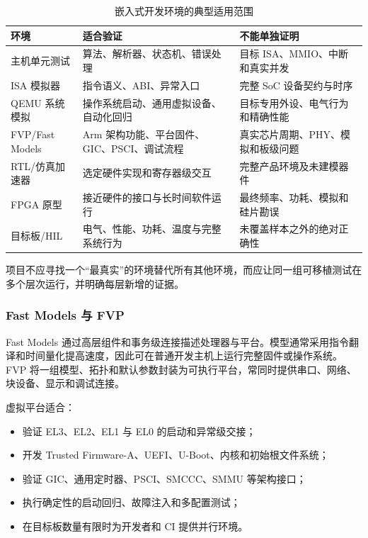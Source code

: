 \begin{table}[htbp]
  \centering
  \caption{嵌入式开发环境的典型适用范围}
  \begin{tabular}{p{}p{}p{}}
    \toprule
    环境 & 适合验证 & 不能单独证明 \\
    \midrule
    主机单元测试 & 算法、解析器、状态机、错误处理 & 目标 ISA、MMIO、中断和真实并发 \\
    ISA 模拟器 & 指令语义、ABI、异常入口 & 完整 SoC 设备契约与时序 \\
    QEMU 系统模拟 & 操作系统启动、通用虚拟设备、自动化回归 & 目标专用外设、电气行为和精确性能 \\
    \shortstack[l]{FVP/Fast\\Models} & Arm 架构功能、平台固件、GIC、PSCI、调试流程 & 真实芯片周期、PHY、模拟和板级问题 \\
    RTL/仿真加速器 & 选定硬件实现和寄存器级交互 & 完整产品环境及未建模器件 \\
    FPGA 原型 & 接近硬件的接口与长时间软件运行 & 最终频率、功耗、模拟和硅片勘误 \\
    目标板/HIL & 电气、性能、功耗、温度与完整系统行为 & 未覆盖样本之外的绝对正确性 \\
    \bottomrule
  \end{tabular}
\end{table}

项目不应寻找一个“最真实”的环境替代所有其他环境，而应让同一组可移植测试在多个层次运行，并明确每层新增的证据。

\subsubsection{Fast Models 与 FVP}

Fast Models 通过高层组件和事务级连接描述处理器与平台。模型通常采用指令翻译和时间量化提高速度，因此可在普通开发主机上运行完整固件或操作系统。FVP 将一组模型、拓扑和默认参数封装为可执行平台，常同时提供串口、网络、块设备、显示和调试连接。

虚拟平台适合：

\begin{itemize}
  \item 验证 EL3、EL2、EL1 与 EL0 的启动和异常级交接；
  \item 开发 Trusted Firmware-A、UEFI、U-Boot、内核和初始根文件系统；
  \item 验证 GIC、通用定时器、PSCI、SMCCC、SMMU 等架构接口；
  \item 执行确定性的启动回归、故障注入和多配置测试；
  \item 在目标板数量有限时为开发者和 CI 提供并行环境。
\end{itemize}

